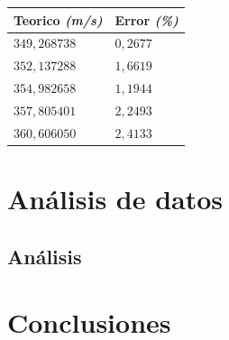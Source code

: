 \documentclass[twocolumn, 12pt]{article}
\newcommand{\bolditalic}[1]{\textbf{\textit{#1}}}
\begin{document}
\begin{table}[H]
    \begin{center}
        \begin{tabularx}{.9\linewidth}{|>{\centering\arraybackslash}X|>{\centering\arraybackslash}X|}
            \hline
            Teorico \bolditalic{(m/s)} & Error \bolditalic{(\%)} \\\hline
            $349,268738$               & $0,2677$                \\\hline
            $352,137288$               & $1,6619$                \\\hline
            $354,982658$               & $1,1944$                \\\hline
            $357,805401$               & $2,2493$                \\\hline
            $360,606050$               & $2,4133$                \\\hline
        \end{tabularx}
    \end{center}
\end{table}

\section{Análisis de datos}

\subsection{Análisis}

\section{Conclusiones}

\printbibliography
\end{document}
